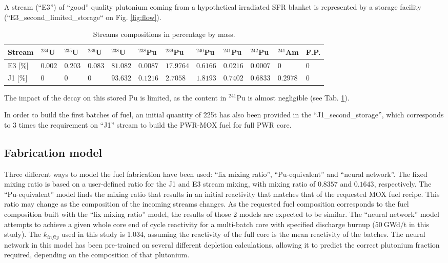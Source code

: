 \documentclass{anstrans}
\begin{document}
A stream (``E3'') of ``good'' quality plutonium coming from a hypothetical irradiated
SFR blanket is represented by a storage facility
(``E3\_second\_limited\_storage`` on Fig. \ref{fig:flow}).

\begin{table}[htb]
  \centering
  \begin{tabular}{llllllllllll}\toprule
    Stream 
    & $^{234}$U   & $^{235}$U   & $^{236}$U   & $^{238}$U   
    & $^{238}$Pu  & $^{239}$Pu  & $^{240}$Pu  & $^{241}$Pu  & $^{242}$Pu 
    & $^{241}$Am  & F.P. \\ \midrule
    E3 [\%]
    & $0.002$   & $0.203$    & $0.083$   & $81.082$
    & $0.0087$  & $17.9764$  & $0.6166$  & $0.0216$  & $0.0007$
    & $0$         & $0$ \\
    J1 [\%]
    & $0$       & $0$        & $0$       & $93.632$
    & $0.1216$  & $2.7058$   & $1.8193$  & $0.7402$  & $0.6833$
    & $0.2978$  & $0$ \\
    \bottomrule
  \end{tabular}
  \caption{Streams compositions in percentage by mass.}
  \label{tab:stream_compo}
\end{table}

The impact of the decay on this stored Pu is limited, as the content in
$^{241}$Pu is almost negligible (see Tab. \ref{tab:stream_compo}).  
 
In order to build the first batches of fuel, an initial quantity of 225t has
also been provided in the ``J1\_second\_storage'', which corresponds to 3 times
the requirement on ``J1'' stream to build the PWR-MOX fuel for full PWR
core. 




\subsection{Fabrication model}
Three different ways to model the fuel fabrication have been used: ``fix mixing
ratio'', ``Pu-equivalent'' and ``neural network''.
The fixed mixing ratio is based on a user-defined ratio for the J1 and E3 stream
mixing, with mixing ratio of $0.8357$ and $0.1643$, respectively.
The ``Pu-equivalent'' model finds the mixing ratio that results in an initial
reactivity that matches that of the requested MOX fuel recipe.  This ratio may
change as the composition of the incoming streams changes.  As the requested
fuel composition corresponds to the fuel composition built with the ``fix mixing
ratio'' model, the results of those 2 models are expected to be similar.  The
``neural network'' model attempts to achieve a given whole core end of cycle 
reactivity for a multi-batch core with specified discharge burnup ($50~$GWd/t in this
study). The $k_{infty}$ used in this study is 1.034, assuming the reactivity of
the full core is the mean reactivity of the batches. The neural network in this
model has been pre-trained on several different depletion calculations, allowing
it to predict the correct plutonium fraction required, depending on the
composition of that plutonium.
\end{document}
